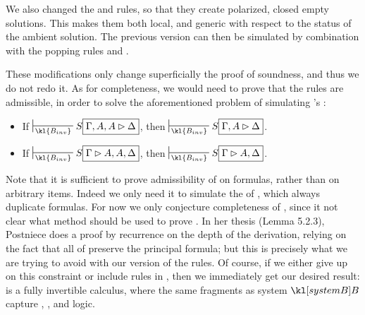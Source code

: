 \begin{remark}
  We also changed the \rsf{\bot{-}} and \rsf{\top{+}} rules, so that they create
  polarized, closed empty solutions. This makes them both local, and generic
  with respect to the status of the ambient solution. The previous version can
  then be simulated by combination with the popping rules  and
  .
\end{remark}

These modifications only change superficially the proof of soundness, and thus
we do not redo it. As for completeness, we would need to prove that the
 rules are admissible, in order to solve the aforementioned problem
of simulating 's :

\begin{lemma}
  \sbr
  \begin{itemize}
    \item If $\prov{\kl{B_{inv}}} S\select{\Gamma, A, A \J \Delta}$, then
          $\prov{\kl{B_{inv}}} S\select{\Gamma, A \J \Delta}$.
    \item If $\prov{\kl{B_{inv}}} S\select{\Gamma \J A, A, \Delta}$, then
          $\prov{\kl{B_{inv}}} S\select{\Gamma \J A, \Delta}$.
  \end{itemize}
\end{lemma}

Note that it is sufficient to prove admissibility of  on
formulas, rather than on arbitrary items. Indeed we only need it to simulate the
 of , which always duplicate formulas. For now
we only conjecture completeness of , since it not clear what method
should be used to prove . In her thesis
\cite{postniece_proof_2010} (Lemma 5.2.3), Postniece does a proof by recurrence
on the depth of the derivation, relying on the fact that all  of  preserve the principal formula; but this is precisely what
we are trying to avoid with our version of the rules. Of course, if we either
give up on this constraint or include  rules in , then we
immediately get our desired result:  is a fully invertible calculus,
where the same fragments as system $\sysB$ capture ,
,  and  logic.

